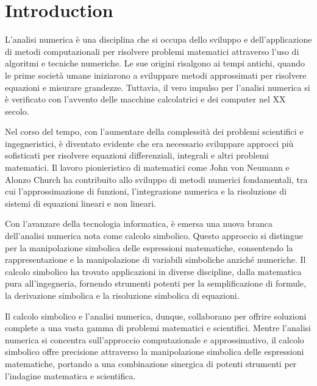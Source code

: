 
\chapter{Introduction}
\label{chap1:introduction}

L'analisi numerica è una disciplina che si occupa dello sviluppo e dell'applicazione di metodi computazionali per risolvere problemi matematici attraverso l'uso di algoritmi e tecniche numeriche. Le sue origini risalgono ai tempi antichi, quando le prime società umane iniziarono a sviluppare metodi approssimati per risolvere equazioni e misurare grandezze. Tuttavia, il vero impulso per l'analisi numerica si è verificato con l'avvento delle macchine calcolatrici e dei computer nel XX secolo.

Nel corso del tempo, con l'aumentare della complessità dei problemi scientifici e ingegneristici, è diventato evidente che era necessario sviluppare approcci più sofisticati per risolvere equazioni differenziali, integrali e altri problemi matematici. Il lavoro pionieristico di matematici come John von Neumann e Alonzo Church ha contribuito allo sviluppo di metodi numerici fondamentali, tra cui l'approssimazione di funzioni, l'integrazione numerica e la risoluzione di sistemi di equazioni lineari e non lineari.

Con l'avanzare della tecnologia informatica, è emersa una nuova branca dell'analisi numerica nota come calcolo simbolico. Questo approccio si distingue per la manipolazione simbolica delle espressioni matematiche, consentendo la rappresentazione e la manipolazione di variabili simboliche anziché numeriche. Il calcolo simbolico ha trovato applicazioni in diverse discipline, dalla matematica pura all'ingegneria, fornendo strumenti potenti per la semplificazione di formule, la derivazione simbolica e la risoluzione simbolica di equazioni.

Il calcolo simbolico e l'analisi numerica, dunque, collaborano per offrire soluzioni complete a una vasta gamma di problemi matematici e scientifici. Mentre l'analisi numerica si concentra sull'approccio computazionale e approssimativo, il calcolo simbolico offre precisione attraverso la manipolazione simbolica delle espressioni matematiche, portando a una combinazione sinergica di potenti strumenti per l'indagine matematica e scientifica.
